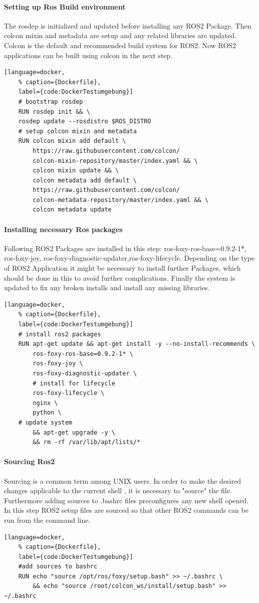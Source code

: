 \paragraph{Setting up Ros Build environment} The rosdep is initialized and updated before installing any ROS2 Package. Then colcon mixin and metadata are setup and any related libraries are updated. Colcon is the default and recommended build system for ROS2. Now ROS2 applications can be built using colcon in the next step.
\begin{lstlisting}[language=docker,
	% caption={Dockerfile}, 
	label={code:DockerTestumgebung}]
	# bootstrap rosdep
	RUN rosdep init && \
	rosdep update --rosdistro $ROS_DISTRO
	# setup colcon mixin and metadata
	RUN colcon mixin add default \
		https://raw.githubusercontent.com/colcon/
		colcon-mixin-repository/master/index.yaml && \
		colcon mixin update && \
		colcon metadata add default \
		https://raw.githubusercontent.com/colcon/
		colcon-metadata-repository/master/index.yaml && \
		colcon metadata update
\end{lstlisting}

\paragraph*{Installing necessary Ros packages} Following ROS2 Packages are installed in this step: ros-foxy-ros-base=0.9.2-1*, ros-foxy-joy, ros-foxy-diagnostic-updater,ros-foxy-lifecycle. Depending on the type of ROS2 Application it might be necessary to install further Packages, which should be done in this to avoid further complications. Finally the system is updated to fix any broken installs and install any missing libraries.
\begin{lstlisting}[language=docker,
	% caption={Dockerfile}, 
	label={code:DockerTestumgebung}]
	# install ros2 packages
	RUN apt-get update && apt-get install -y --no-install-recommends \
		ros-foxy-ros-base=0.9.2-1* \
		ros-foxy-joy \
		ros-foxy-diagnostic-updater \
		# install for lifecycle 
		ros-foxy-lifecycle \
		nginx \
		python \
	# update system
		&& apt-get upgrade -y \
		&& rm -rf /var/lib/apt/lists/* 
\end{lstlisting}


\paragraph*{Sourcing Ros2} Sourcing is a common term among UNIX users. In order to make the desired changes applicable to the current shell , it is necessary to "source" the file. Furthermore adding sources to .bashrc files preconfigures any new shell opened. In this step ROS2 setup files are sourced so that other ROS2 commands can be run from the command line. 
\begin{lstlisting}[language=docker,
	% caption={Dockerfile}, 
	label={code:DockerTestumgebung}]
	#add sources to bashrc
	RUN echo "source /opt/ros/foxy/setup.bash" >> ~/.bashrc \
		&& echo "source /root/colcon_ws/install/setup.bash" >> ~/.bashrc
\end{lstlisting}

